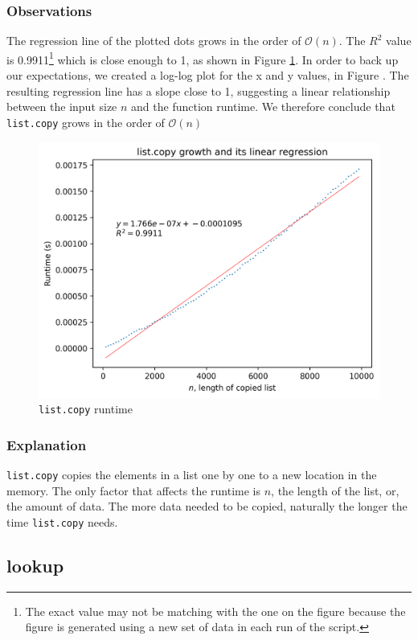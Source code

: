 \documentclass[titlepage, 12pt]{article}
\begin{document}
\subsubsection{Observations}

The regression line of the plotted dots grows in the order of \( \mathcal{O}(n)
\). The \( R^2 \) value is 0.9911\footnote{The exact value may not be matching
  with the one on the figure because the figure is generated using a new set of
  data in each run of the script.} which is close enough to 1, as shown in
Figure \ref{fig:copy-linreg}. In order to back up our expectations, we created a
log-log plot for the x and y values, in Figure . The resulting regression line
has a slope close to 1, suggesting a linear relationship between the input size
\( n \) and the function runtime. We therefore conclude that \texttt{list.copy}
grows in the order of \( \mathcal{O}(n) \)
\begin{figure}[H]
  \includegraphics[width=0.8\linewidth]{copy-linreg.png}
  \centering
  \caption{\texttt{list.copy} runtime}
  \label{fig:copy-linreg}
\end{figure}

\subsubsection{Explanation}

\texttt{list.copy} copies the elements in a list one by one to a new location in
the memory. The only factor that affects the runtime is \( n \), the length of
the list, or, the amount of data. The more data needed to be copied, naturally
the longer the time \texttt{list.copy} needs.

\subsection{lookup}
\end{document}
